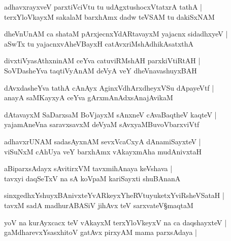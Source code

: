 \begin{shloka}
adhavxrayxveV parxtiVciVtu tu udAgxtushocxVtatxrA tathA |\\
terxYloVkayxM sakalaM barxhAmx dadw teVSAM tu dakiSxNAM 
\end{shloka}

\begin{shloka}
dheVnUnAM ca shataM pArxjecnxYdARtavayxM yajacnx sidadhxyeV |\\
aSwTx tu yajacnxvAheVBayxH catAvxriMshAdhikAsatxthA 
\end{shloka}

\begin{shloka}
divxtiVyasAthxninAM ceYva catuviRMshAH parxkiVtiRtAH |\\
SoVDasheYva taqtiVyAnAM deVyA veY dheVnavashuyxBAH
\end{shloka}

\begin{shloka}
dAvxdasheYva tathA cAnAyx AginxVdhArxdheyxVSu dApayeVtf |\\
anayA saMKayxyA ceYva gArxmAnAdxsAnajAvikaM
\end{shloka}

\begin{shloka}
dAtavayxM SaDarxsaM BoVjayxM sAnxneV cAvaBaqtheV kaqteV |\\
yajamAneVna saravxsavxM deVyaM sAvxyaMBuvoVbarxviVtf
\end{shloka}

\begin{shloka}
adhavxrUNAM sadasAyxnAM sevxVcaCxyA dAnamiSayxteV |\\
viSuNxM cAhUya veY barxhAmx vAkayxmAha mudAnivxtaH 
\end{shloka}
\begin{shloka}
aBiparxsAdayx sAvitirxVM tavxmihAnaya keVshava |\\
tavxyi daqSeTxV na sA koVpaM kariSayxti shuBAnanA 
\end{shloka}

\begin{shloka}
sinxgedhxYshuyxBAnivxteYvARkeyxYheRVtuyuketxYviRsheVSataH |\\
tavxM sadA madhurABASiV jihAvx teV sarxvateV\S maqtaM
\end{shloka}

\begin{shloka}
yoV na kurAyxcacx teV vAkayxM terxYloVkeyxV na ca daqshayxteV |\\
gaMdharevxYsasxhitoV gatAvx pirxyAM mama parxsAdaya |
\end{shloka}

